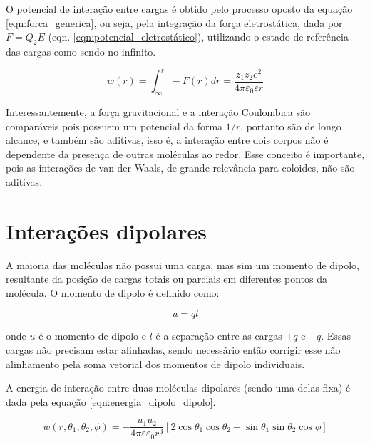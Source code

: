 	O potencial de interação entre cargas é obtido pelo processo oposto da equação \ref{eqn:forca_generica}, ou seja, pela integração da força eletrostática, dada por \(F = Q_2 E\) (eqn. \ref{eqn:potencial_eletrostático}), utilizando o estado de referência das cargas como sendo no infinito.
	
	\begin{equation}
		w(r) = \int_\infty^r -F(r)dr = \dfrac{z_1z_2e^2}{4\pi\varepsilon_0\varepsilon r}
		\label{eqn:potencial_eletrostático}
	\end{equation} 
	
	Interessantemente, a força gravitacional e a interação Coulombica são comparáveis pois possuem um potencial da forma \(1/r\), portanto são de longo alcance, e também são aditivas, isso é, a interação entre dois corpos não é dependente da presença de outras moléculas ao redor. Esse conceito é importante, pois as interações de van der Waals, de grande relevância para coloides, não são aditivas. %
	
	\section{Interações dipolares} 
	
	A maioria das moléculas não possui uma carga, mas sim um momento de dipolo, resultante da posição de cargas totais ou parciais em diferentes pontos da molécula. O momento de dipolo é definido como:
	
	\begin{equation}
		u = ql
		\label{eqn:momento_dipolo}
	\end{equation} 
	
	\noindent onde \(u\) é o momento de dipolo e \(l\) é a separação entre as cargas \(+q\) e \(-q\). Essas cargas não precisam estar alinhadas, sendo necessário então corrigir esse não alinhamento pela soma vetorial dos momentos de dipolo individuais.
	
	A energia de interação entre duas moléculas dipolares (sendo uma delas fixa) é dada pela equação \ref{eqn:energia_dipolo_dipolo}.
	
	\begin{equation}
		w \left( r , \theta _ { 1 } , \theta _ { 2 } , \phi \right) = - \frac { u _ { 1 } u _ { 2 } } { 4 \pi \varepsilon \varepsilon _ { 0 } r ^ { 3 } } \left[ 2 \cos \theta _ { 1 } \cos \theta _ { 2 } - \sin \theta _ { 1 } \sin \theta _ { 2 } \cos \phi \right]
		\label{eqn:energia_dipolo_dipolo}
	\end{equation} 
	
